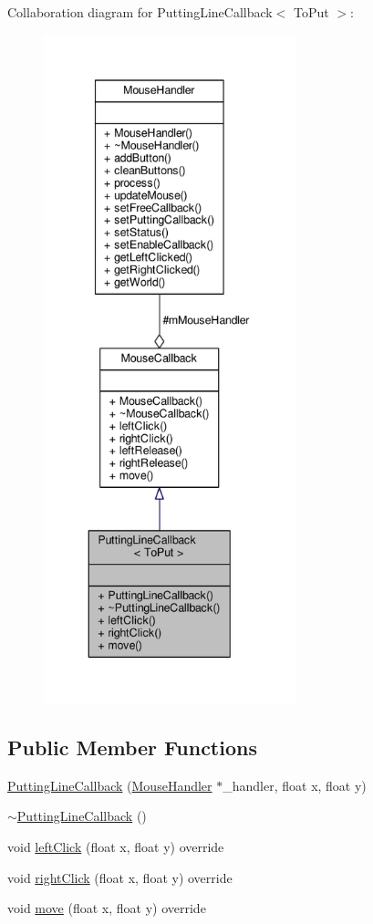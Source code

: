 Collaboration diagram for Putting\+Line\+Callback$<$ To\+Put $>$\+:\nopagebreak
\begin{figure}[H]
\begin{center}
\leavevmode
\includegraphics[height=550pt]{classPuttingLineCallback__coll__graph}
\end{center}
\end{figure}
\subsection*{Public Member Functions}
\begin{DoxyCompactItemize}
\item 
\hyperlink{classPuttingLineCallback_a7bf8b242abd061bbe1724f837c379ea2}{Putting\+Line\+Callback} (\hyperlink{classMouseHandler}{Mouse\+Handler} $\ast$\+\_\+handler, float x, float y)
\item 
\hyperlink{classPuttingLineCallback_a3835ab594c3a188eae9d8beff4802e5f}{$\sim$\+Putting\+Line\+Callback} ()
\item 
void \hyperlink{classPuttingLineCallback_a5a4c924a90e4b2ec3a359ae1f958d168}{left\+Click} (float x, float y) override
\item 
void \hyperlink{classPuttingLineCallback_a87d406ea7eb6fb24f2777b9bb8032a5a}{right\+Click} (float x, float y) override
\item 
void \hyperlink{classPuttingLineCallback_abc6f400a8e408faa4ae2ebbc8eef8dca}{move} (float x, float y) override
\end{DoxyCompactItemize}
